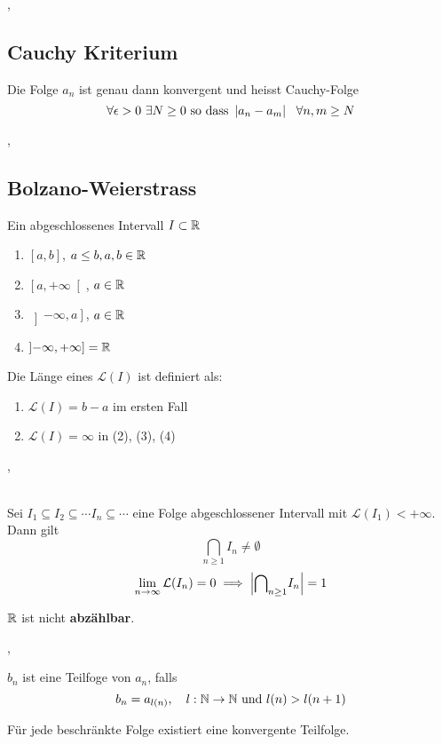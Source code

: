 \sep 

\subsection{Cauchy Kriterium}

 Die Folge $a_{n}$ ist genau dann konvergent und heisst Cauchy-Folge
\[
\forall \epsilon > 0 \ \exists N \geq 0 \text{ so dass } \left\lvert a_{n} - a_{m} \right\rvert \ \ \forall n, m \geq N
\]

\sep

\subsection{Bolzano-Weierstrass}

\Def[2.5.1] Ein abgeschlossenes Intervall $I \subset \mathbb{R}$ 
\begin{enumerate}
\item[1)] $\left[ a, b \right]$, $a \leq b, a, b \in \mathbb{R}$
\item[2)] $\left[ a, +\infty \right[$, $a \in \mathbb{R}$
\item[3)] $\left] -\infty, a \right]$, $a \in \mathbb{R}$
\item[4)] $\left] -\infty, +\infty \right] = \mathbb{R}$
\end{enumerate}

Die Länge eines $\mathcal{L}(I)$ ist definiert als:
\begin{enumerate} 
\item[•] $\mathcal{L}(I) = b - a$   \quad im ersten Fall
\item[•] $\mathcal{L}(I) = \infty$  \qquad in (2), (3), (4)
\end{enumerate}
\sep

\\ Sei ${I_{1} \subseteq I_{2} \subseteq \cdots I_{n} \subseteq \cdots}$ eine Folge abgeschlossener Intervall mit $\mathcal{L}(I_{1}) < +\infty$. Dann gilt
\[ {\bigcap}_{n\geq1} I_{n} \neq \emptyset \]
\[ \lim\limits_{n \rightarrow \infty} \mathcal{L}(I_{n}) = 0 \implies \left\lvert {\bigcap}_{n\geq1} I_{n} \right\rvert = 1\]

\Satz[2.5.6] $\mathbb{R}$ ist nicht \textbf{abzählbar}.

\sep

\Def[2.5.7] $b_{n}$ ist eine Teilfoge von $a_{n}$, falls 
\[b_{n} = a_{l(n)}, \quad l : \mathbb{N}\rightarrow \mathbb{N}\text{ und } l(n) > l(n + 1) \]

 Für jede beschränkte Folge existiert eine konvergente Teilfolge.

